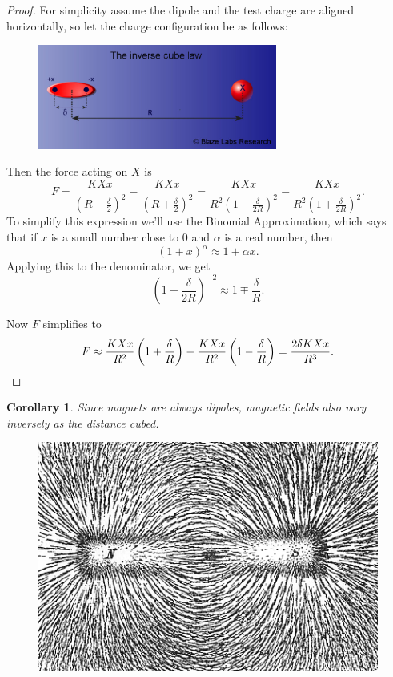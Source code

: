 \documentclass[12pt]{article}
\theoremstyle{plain}
\newtheorem{corollary}[theorem]{Corollary}
\theoremstyle{definition}
\theoremstyle{remark}
\begin{document}
\begin{proof}
For simplicity assume the dipole and the test charge are aligned horizontally, so let the charge configuration be as follows:
\begin{figure}[H]
\centering
\includegraphics[width=0.7\textwidth]{inversecubedipole}
\end{figure}

Then the force acting on $X$ is $$F = \frac{KXx}{(R - \frac{\delta}{2})^2} - \frac{KXx}{(R + \frac{\delta}{2})^2} = \frac{KXx}{R^2(1 - \frac{\delta}{2R})^2} - \frac{KXx}{R^2(1 + \frac{\delta}{2R})^2}.$$
To simplify this expression we'll use the Binomial Approximation, which says that if $x$ is a small number close to 0 and $\alpha$ is a real number, then $$(1 + x)^\alpha \approx 1 + \alpha x.$$
Applying this to the denominator, we get $$\left(1 \pm \frac{\delta}{2R}\right)^{-2} \approx 1 \mp \frac{\delta}{R}.$$

Now $F$ simplifies to $$F \approx \frac{KXx}{R^2}\left(1 + \frac{\delta}{R}\right) - \frac{KXx}{R^2}\left(1 - \frac{\delta}{R}\right) = \frac{2\delta KXx}{R^3}.\qedhere$$
\end{proof}

\begin{corollary}
Since magnets are always dipoles, magnetic fields also vary inversely as the distance cubed.
\end{corollary}

\begin{figure}[H]
\centering
\includegraphics[width=.7\textwidth]{Magnet0873}
\end{figure}
\end{document}

